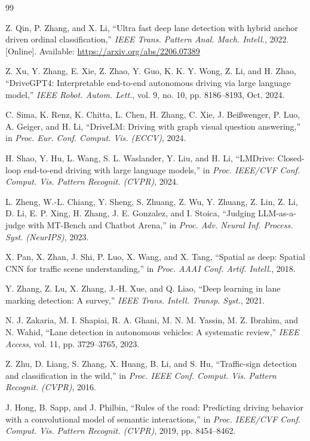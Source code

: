 \documentclass[a4paper,12pt]{report}
\begin{document}
\begin{thebibliography}{99}

Z. Qin, P. Zhang, and X. Li, ``Ultra fast deep lane detection with hybrid anchor driven ordinal classification,'' \textit{IEEE Trans. Pattern Anal. Mach. Intell.}, 2022. [Online]. Available: \url{https://arxiv.org/abs/2206.07389}

Z. Xu, Y. Zhang, E. Xie, Z. Zhao, Y. Guo, K. K. Y. Wong, Z. Li, and H. Zhao, ``DriveGPT4: Interpretable end-to-end autonomous driving via large language model,'' \textit{IEEE Robot. Autom. Lett.}, vol. 9, no. 10, pp. 8186--8193, Oct. 2024.

C. Sima, K. Renz, K. Chitta, L. Chen, H. Zhang, C. Xie, J. Bei{\ss}wenger, P. Luo, A. Geiger, and H. Li, ``DriveLM: Driving with graph visual question answering,'' in \textit{Proc. Eur. Conf. Comput. Vis. (ECCV)}, 2024.

H. Shao, Y. Hu, L. Wang, S. L. Waslander, Y. Liu, and H. Li, ``LMDrive: Closed-loop end-to-end driving with large language models,'' in \textit{Proc. IEEE/CVF Conf. Comput. Vis. Pattern Recognit. (CVPR)}, 2024.

L. Zheng, W.-L. Chiang, Y. Sheng, S. Zhuang, Z. Wu, Y. Zhuang, Z. Lin, Z. Li, D. Li, E. P. Xing, H. Zhang, J. E. Gonzalez, and I. Stoica, ``Judging LLM-as-a-judge with MT-Bench and Chatbot Arena,'' in \textit{Proc. Adv. Neural Inf. Process. Syst. (NeurIPS)}, 2023.

X. Pan, X. Zhan, J. Shi, P. Luo, X. Wang, and X. Tang, ``Spatial as deep: Spatial CNN for traffic scene understanding,'' in \textit{Proc. AAAI Conf. Artif. Intell.}, 2018.

Y. Zhang, Z. Lu, X. Zhang, J.-H. Xue, and Q. Liao, ``Deep learning in lane marking detection: A survey,'' \textit{IEEE Trans. Intell. Transp. Syst.}, 2021.

N. J. Zakaria, M. I. Shapiai, R. A. Ghani, M. N. M. Yassin, M. Z. Ibrahim, and N. Wahid, ``Lane detection in autonomous vehicles: A systematic review,'' \textit{IEEE Access}, vol. 11, pp. 3729--3765, 2023.

Z. Zhu, D. Liang, S. Zhang, X. Huang, B. Li, and S. Hu, ``Traffic-sign detection and classification in the wild,'' in \textit{Proc. IEEE Conf. Comput. Vis. Pattern Recognit. (CVPR)}, 2016.

J. Hong, B. Sapp, and J. Philbin, ``Rules of the road: Predicting driving behavior with a convolutional model of semantic interactions,'' in \textit{Proc. IEEE/CVF Conf. Comput. Vis. Pattern Recognit. (CVPR)}, 2019, pp. 8454--8462.


\end{thebibliography}
\end{document}
